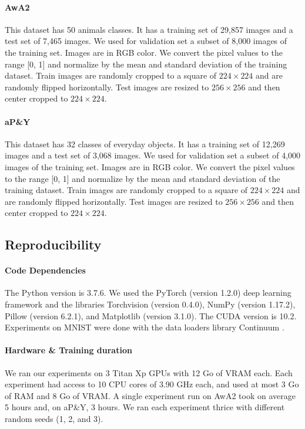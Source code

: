 \paragraph{AwA2} This dataset has 50 animals classes. It has a training set of 29,857 images and a
test set of 7,465 images. We used for validation set a subset of 8,000 images of the training set.
Images are in RGB color. We convert the pixel values to the range [0, 1] and normalize by the mean
and standard deviation of the training dataset. Train images are randomly cropped to a square of
$224\times224$ and are randomly flipped horizontally. Test images are resized to $256\times256$ and
then center cropped to $224\times224$.

\paragraph{aP\&Y} This dataset has 32 classes of everyday objects. It has a training set of 12,269
images and a test set of 3,068 images. We used for validation set a subset of 4,000 images of the
training set. Images are in RGB color. We convert the pixel values to the range [0, 1] and normalize
by the mean and standard deviation of the training dataset. Train images are randomly cropped to a
square of $224\times224$ and are randomly flipped horizontally. Test images are resized to
$256\times256$ and then center cropped to $224\times224$.

\subsection{Reproducibility}

\paragraph{Code Dependencies} The Python version is  3.7.6. We used the PyTorch
\citet{paszke2017pytorch} (version 1.2.0) deep learning framework and the libraries Torchvision
(version 0.4.0), NumPy \citet{oliphant2006numpy} (version 1.17.2), Pillow (version 6.2.1), and
Matplotlib \citet{hunter2007matplotlib} (version 3.1.0). The CUDA version is 10.2. Experiments on
MNIST were done with the data loaders library Continuum \citet{douillardlesort2021continuum}.

\paragraph{Hardware \& Training duration} We ran our experiments on 3 Titan Xp GPUs with 12 Go of
VRAM each. Each experiment had access to 10 CPU cores of 3.90 GHz each, and used at most 3 Go of RAM
and 8 Go of VRAM. A single experiment run on AwA2 took on average 5 hours and, on aP\&Y, 3 hours. We
ran each experiment thrice with different random seeds (1, 2, and 3).

